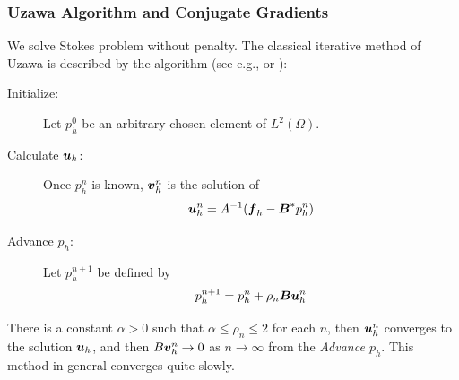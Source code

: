 \documentclass[a4paper,twoside,12pt]{book}
\def\vec#1{\mbox{\boldmath $#1$}}
\def\setS#1{#1\label{sec:#1}}
\begin{document}
\subsubsection{\setS{Uzawa} Algorithm and Conjugate Gradients}
We solve Stokes problem without penalty.
The classical iterative method of Uzawa is described by the algorithm
(see e.g.\cite[17.3]{RT93}, \cite[13]{GP79} or \cite[13]{RG84}  ):
\begin{description}
  \item[Initialize:] Let $p_h^0$ be an arbitrary chosen element of
  $L^2(\Omega)$.
  \item[Calculate $\vec{u}_h$:] Once $p_h^n$ is known, $\vec{v}_h^n$ is the solution of
  \[
  \vec{u}_h^n = A^{-1}(\vec{f}_h-\vec{B}^*p_h^n)
  \]
  \item[Advance $p_h$:] Let $p_h^{n+1}$ be defined by
  \[
  p_h^{n+1}=p_h^n+\rho_n\vec{B}\vec{u}_h^n
  \]
\end{description}
There is a constant $\alpha>0$ such that $\alpha\le \rho_n\le 2$ for each $n$,
then $\vec{u}_h^n$ converges to the solution $\vec{u}_h$, and then
$B\vec{v}_h^n\to 0$ as $n\to \infty$ from the \emph{Advance $p_h$}.
This method in general converges quite slowly.
\end{document}
